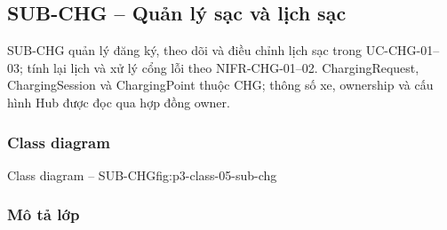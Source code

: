 \par\medskip
\noindent\begin{minipage}{\linewidth}
\subsection{SUB-CHG -- Quản lý sạc và lịch sạc}
SUB-CHG quản lý đăng ký, theo dõi và điều chỉnh lịch sạc trong UC-CHG-01--03; tính lại lịch và xử lý cổng lỗi theo NIFR-CHG-01--02. ChargingRequest, ChargingSession và ChargingPoint thuộc CHG; thông số xe, ownership và cấu hình Hub được đọc qua hợp đồng owner.

\subsubsection{Class diagram}
{Class diagram -- SUB-CHG}{fig:p3-class-05-sub-chg}
\end{minipage}\par


\subsubsection{Mô tả lớp}

